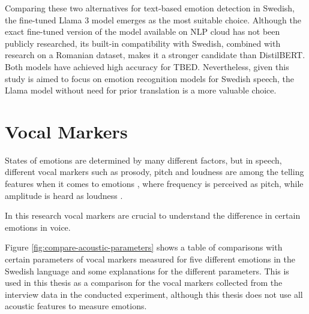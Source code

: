  Comparing these two alternatives for text-based emotion detection in Swedish, the fine-tuned Llama 3 model emerges as the most suitable choice. Although the exact fine-tuned version of the model available on NLP cloud has not been publicly researched, its built-in compatibility with Swedish, combined with research on a Romanian dataset, makes it a stronger candidate than DistilBERT. Both models have achieved high accuracy for TBED. Nevertheless, given this study is aimed to focus on emotion recognition models for Swedish speech, the Llama model without need for prior translation is a more valuable choice. 

 

\section{Vocal Markers}
\label{sec:vocal-markers}

 States of emotions are determined by many different factors, but in speech, different vocal markers such as prosody, pitch and loudness are among the telling features when it comes to emotions \autocite{Ekberg2023}, where frequency is perceived as pitch, while amplitude is heard as loudness \autocite{Frhholz2019}.

In this research vocal markers are crucial to understand the difference in certain emotions in voice.

 Figure \ref{fig:compare-acoustic-parameters} \autocite{Ekberg2023} shows a table of comparisons with certain parameters of vocal markers measured for five different emotions in the Swedish language and some explanations for the different parameters. This is used in this thesis as a comparison for the vocal markers collected from the interview data in the conducted experiment, although this thesis does not use all acoustic features to measure emotions.
 
